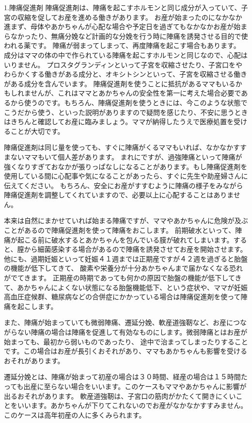 1.陣痛促進剤
陣痛促進剤は、陣痛を起こすホルモンと同じ成分が入っていて、子宮の収縮を促してお産を進める働きがあります。
お産が始まったのになかなか進まず、母体やあかちゃんが心配な場合や予定日を過ぎてもなかなかお産が始まらなかったり、無痛分娩など計画的な分娩を行う時に陣痛を誘発させる目的で使われる薬です。
陣痛が弱まってしまって、再度陣痛を起こす場合もあります。
成分はママの体の中で作られている陣痛を起こすホルモンと同じなので、心配はいりません。
プロスタグランディンといって子宮を収縮させたり、子宮口をやわらかくする働きがある成分と、オキシトシンといって、子宮を収縮させる働きがある成分を含んでいます。
陣痛促進剤を使うことに抵抗があるママもいるかもしれませんが、これはママとあかちゃんの安全性を第一に考えた場合必要であるから使うのです。もちろん、陣痛促進剤を使うときには、今このような状態でこうだから使う、といった説明がありますので疑問を感じたり、不安に思うときはきちんと確認してお産に臨みましょう。ママが納得したうえで医療処置を受けることが大切です。

陣痛促進剤は同じ量を使っても、すぐに陣痛がくるママもいれば、なかなかすすまないママもいて個人差があります。
まれにですが、過強陣痛といって陣痛が強くなりすぎておなかが張りっぱなしになることがあります。もし陣痛促進剤を使用している間に心配事や気になることがあったら、すぐに先生や助産婦さんに伝えてください。
もちろん、安全にお産がすすむように陣痛の様子をみながら陣痛促進剤を調整してくれていますので、必要以上に心配することはありません。

本来は自然にまかせていれば始まる陣痛ですが、ママやあかちゃんに危険が及ぶことがあるので陣痛促進剤を使って陣痛をおこします。
前期破水といって、陣痛が起こる前に破水するとあかちゃんを包んでいる膜が破れてしまいます。すると、膣から細菌感染する場合があるので陣痛を誘発させてお産を開始させます。
他にも、過期妊娠といって妊娠４１週までは正期産ですが４２週を過ぎると胎盤の機能が低下してきて、
酸素や栄養分が十分あかちゃんまで届かなくなる恐れがでてきます。
正期産の時期であっても何かの原因で胎盤の機能が低下してきて、あかちゃんによくない状態になる胎盤機能低下、という症状や、ママが妊娠高血圧症候群、糖尿病などの合併症にかかっている場合は陣痛促進剤を使って陣痛を起こします。

また、陣痛が始まっていても微弱陣痛、遷延分娩、軟産道強靭など、お産につながらない陣痛の場合は陣痛を促進して有効なものにします。微弱陣痛とはお産が始まっても、最初から弱いものであったり、
途中で治まってしまったりすることです。この場合はお産が長引くおそれがあり、ママもあかちゃんも影響を受けるおそれがあります。

遷延分娩とは、陣痛が始まって初産の場合は３０時間、経産の場合は１５時間たっても出産に至らない場合をいいます。このケースもママやあかちゃんに影響が出るおそれがあります。
軟産道強靭は、子宮口の筋肉がかたくて開きにくいことをいいます。あかちゃんが下りてこれないのでお産がなかなかすすみません。このケースは高年初産の人に多くみられます。

